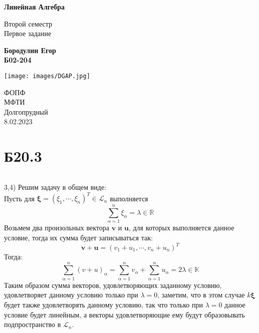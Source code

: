 

\begin{titlepage}
    \begin{center}
        \vspace*{1cm}
            
        \Huge
        \textbf{Линейная Алгебра}
            
        \vspace{0.5cm}
        \LARGE
        Второй семестр\\
        Первое задание
            
        \vspace{1.5cm}
            
        \textbf{Бородулин Егор \\ Б02-204}
        
        \vfill
        
        \texttt{[image: images/DGAP.jpg]}
        
        \vspace{0.8cm}
            
        \Large
        ФОПФ\\
        МФТИ\\
        Долгопрудный\\
        8.02.2023
            
    \end{center}
\end{titlepage}

\section*{Б20.3}$\ $

3,4) Решим задачу в общем виде:\\
Пусть для $\pmb\xi=(\xi_1,\cdots,\xi_n)^{T}\in\mathcal{L}_n$ выполняется $$\sum_{\alpha=1}^{n}\xi_{\alpha}=\lambda\in\mathbb{R}$$
Возьмем два произольных вектора $\pmb v$ и $\pmb u$, для которых выполняется данное условие, тогда их сумма будет записываться так:
$$\pmb{v}+\pmb{u}=(v_1+u_1,\cdots,v_n+u_n)^{T}$$
Тогда:
$$\sum_{\alpha=1}^{n}(v+u)_{\alpha}=\sum_{\alpha=1}^{n}v_{\alpha}+\sum_{\alpha=1}^{n}u_{\alpha}=2\lambda\in\mathbb{K}$$
Таким образом сумма векторов, удовлетворяющих заданному условию, удовлетворяет данному условию только при $\lambda=0$, заметим, что в этом случае $k\pmb{\xi}$ будет также удовлетворять данному условию, так что только при $\lambda=0$ данное условие будет линейным, а векторы удовлетворяющие ему будут образовывать подпространство в $\mathcal{L}_n$.

